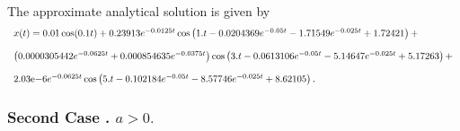 \documentclass{ws-ijbc}
\begin{document}
\noindent The approximate analytical solution is given by%
\[
\begin{tabular}{l}
$x(t)=0.01\cos (0.1t)+0.23913e^{-0.0125t}\cos \left(
1.t-0.0204369e^{-0.05t}-1.71549e^{-0.025t}+1.72421\right) +$ \\ 
\\ 
$\left( 0.0000305442e^{-0.0625t}+0.000854635e^{-0.0375t}\right) \cos \left(
3.t-0.0613106e^{-0.05t}-5.14647e^{-0.025t}+5.17263\right) +$ \\ 
\\ 
$2.03$e$-6e^{-0.0625t}\cos \left(
5.t-0.102184e^{-0.05t}-8.57746e^{-0.025t}+8.62105\right) .$%
\end{tabular}%
\]

\subsubsection{Second Case . $a>0.$}
\end{document}
